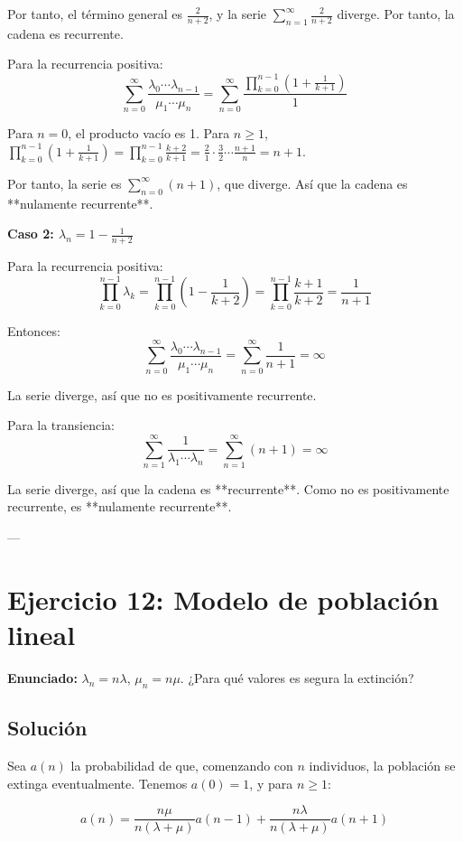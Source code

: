 \documentclass{article}
\theoremstyle{definition}
\begin{document}
Por tanto, el término general es $\frac{2}{n+2}$, y la serie $\sum_{n=1}^\infty \frac{2}{n+2}$ diverge. Por tanto, la cadena es recurrente.

Para la recurrencia positiva:
\[
\sum_{n=0}^\infty \frac{\lambda_0 \cdots \lambda_{n-1}}{\mu_1 \cdots \mu_n} = \sum_{n=0}^\infty \frac{\prod_{k=0}^{n-1} \left(1 + \frac{1}{k+1}\right)}{1}
\]

Para $n=0$, el producto vacío es 1. Para $n \geq 1$, $\prod_{k=0}^{n-1} \left(1 + \frac{1}{k+1}\right) = \prod_{k=0}^{n-1} \frac{k+2}{k+1} = \frac{2}{1} \cdot \frac{3}{2} \cdots \frac{n+1}{n} = n+1$.

Por tanto, la serie es $\sum_{n=0}^\infty (n+1)$, que diverge. Así que la cadena es **nulamente recurrente**.

\textbf{Caso 2: $\lambda_n = 1 - \frac{1}{n+2}$}

Para la recurrencia positiva:
\[
\prod_{k=0}^{n-1} \lambda_k = \prod_{k=0}^{n-1} \left(1 - \frac{1}{k+2}\right) = \prod_{k=0}^{n-1} \frac{k+1}{k+2} = \frac{1}{n+1}
\]

Entonces:
\[
\sum_{n=0}^\infty \frac{\lambda_0 \cdots \lambda_{n-1}}{\mu_1 \cdots \mu_n} = \sum_{n=0}^\infty \frac{1}{n+1} = \infty
\]

La serie diverge, así que no es positivamente recurrente.

Para la transiencia:
\[
\sum_{n=1}^\infty \frac{1}{\lambda_1 \cdots \lambda_n} = \sum_{n=1}^\infty (n+1) = \infty
\]

La serie diverge, así que la cadena es **recurrente**. Como no es positivamente recurrente, es **nulamente recurrente**.

---

\section*{Ejercicio 12: Modelo de población lineal}

\textbf{Enunciado:} $\lambda_n = n\lambda$, $\mu_n = n\mu$. ¿Para qué valores es segura la extinción?

\subsection*{Solución}

Sea $a(n)$ la probabilidad de que, comenzando con $n$ individuos, la población se extinga eventualmente. Tenemos $a(0)=1$, y para $n \geq 1$:

\[
a(n) = \frac{n\mu}{n(\lambda+\mu)} a(n-1) + \frac{n\lambda}{n(\lambda+\mu)} a(n+1)
\]
\end{document}
